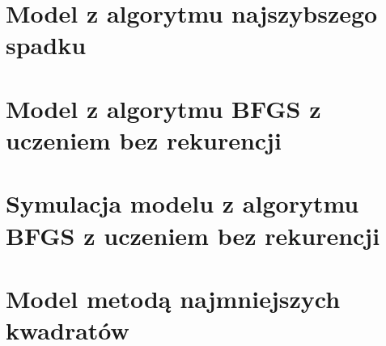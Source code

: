 	\section{Model z algorytmu najszybszego spadku}
		\label{sec:naj_sp}
		
	\section{Model z algorytmu BFGS z uczeniem bez rekurencji}
		\label{sec:bfgs_arx}
		
	\section{Symulacja modelu z algorytmu BFGS z uczeniem bez rekurencji}
		\label{sec:bfgs_arx_sym}
		
	\section{Model metodą najmniejszych kwadratów}
		\label{sec:mnk}